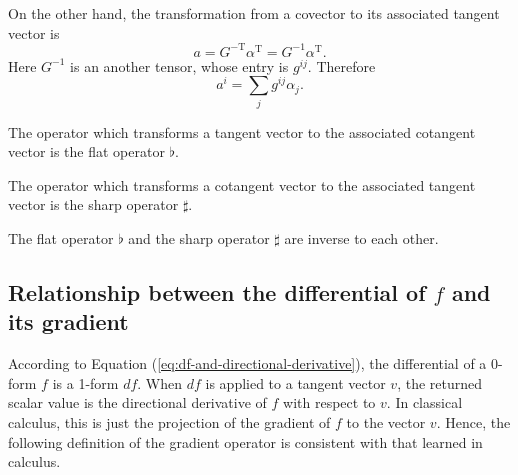 \documentclass[11pt, a4paper]{book}
\begin{document}
On the other hand, the transformation from a covector to its associated tangent vector is
\begin{equation}
  a =  G^{-\mathrm{T}} \alpha^{\mathrm{T}} = G^{-1} \alpha^{\mathrm{T}}.
\end{equation}
Here $G^{-1}$ is an another tensor, whose entry is $g^{ij}$. Therefore
\begin{equation}
  a^i = \sum_{j} g^{ij} \alpha_j.
\end{equation}

\begin{Definition}
  \label{def:flat-operator}
  The operator which transforms a tangent vector to the associated cotangent vector is the
  flat operator $\flat$.
\end{Definition}

\begin{Definition}
  \label{def:sharp-operator}
  The operator which transforms a cotangent vector to the associated tangent vector is the
  sharp operator $\sharp$.
\end{Definition}

The flat operator $\flat$ and the sharp operator $\sharp$ are inverse to each other.

\subsection{Relationship between the differential of $f$ and its gradient}

According to Equation (\ref{eq:df-and-directional-derivative}), the differential of a
0-form $f$ is a 1-form $df$. When $df$ is applied to a tangent vector $v$, the returned
scalar value is the directional derivative of $f$ with respect to $v$. In classical
calculus, this is just the projection of the gradient of $f$ to the vector $v$. Hence, the
following definition of the gradient operator is consistent with that learned in calculus.
\end{document}
